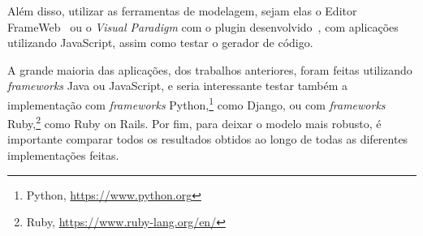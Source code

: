 Além disso, utilizar as ferramentas de modelagem, sejam elas o Editor FrameWeb~\cite{campos:2017} ou o \textit{Visual Paradigm} com o plugin desenvolvido~\cite{silva:2023},
com aplicações utilizando JavaScript, assim como testar o gerador de código.

A grande maioria das aplicações, dos trabalhos anteriores, foram feitas utilizando \textit{frameworks} Java ou JavaScript, e seria interessante
testar também a implementação com \textit{frameworks} Python,\footnote{Python, \url{https://www.python.org}} como Django, ou com \textit{frameworks} Ruby,\footnote{Ruby, \url{https://www.ruby-lang.org/en/}} como Ruby on Rails.
Por fim, para deixar o modelo mais robusto, é importante comparar todos os resultados obtidos ao longo de todas as diferentes implementações feitas.
